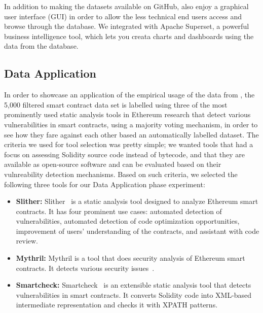 %

	In addition to making the datasets available on GitHub, \etherbase also enjoy a graphical user interface (GUI) in order to allow the less technical end users access and browse through the database.
	We integrated \etherbase with Apache Superset, a powerful business intelligence tool, which lets you creata charts and dashboards using the data from the database.

\subsection{Data Application}
	In order to showcase an application of the empirical usage of the data from \etherbase,  the 5,000 filtered smart contract data set is labelled using three of the most prominently used static analysis tools in Ethereum research that detect various vulnerabilities in smart contracts, using a majority voting mechanism, in order to see how they fare against each other based an automatically labelled dataset.
	The criteria we used for tool selection was pretty simple; we wanted tools that had a focus on assessing Solidity source code instead of bytecode, and that they are available as open-source software and can be evaluated based on their vulnreability detection mechanisms.
	Based on such criteria, we selected the following three tools for our Data Application phase experiment:
	\begin{itemize}
		\item \textbf{Slither:} Slither~\cite{slither} is a static analysis tool designed to analyze Ethereum smart contracts. It has four prominent use cases: automated detection of vulnerabilities, automated detection of code optimization opportunities, improvement of users' understanding of the contracts, and assistant with code review.
		\item \textbf{Mythril:} Mythril is a tool that does security analysis of Ethereum smart contracts. It detects various security issues~\cite{mythril}.
		\item \textbf{Smartcheck:} Smartcheck~\cite{smartcheck} is an extensible static analysis tool that detects vulnerabilities in smart contracts. It converts Solidity code into XML-based intermediate representation and checks it with XPATH patterns.
	\end{itemize}
	
